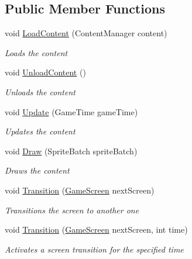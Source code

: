 \subsection*{Public Member Functions}
\begin{DoxyCompactItemize}
\item 
void \hyperlink{class_hel_project_1_1_u_i_1_1_screen_manager_a0077b58a60247c9dc7b4a4cc451b1830}{Load\+Content} (Content\+Manager content)
\begin{DoxyCompactList}\small\item\em Loads the content \end{DoxyCompactList}\item 
void \hyperlink{class_hel_project_1_1_u_i_1_1_screen_manager_a63aa06a4fbc8185e0d414cfc6a54a380}{Unload\+Content} ()
\begin{DoxyCompactList}\small\item\em Unloads the content \end{DoxyCompactList}\item 
void \hyperlink{class_hel_project_1_1_u_i_1_1_screen_manager_aaffdee1d0be5822763de36ce685e12ef}{Update} (Game\+Time game\+Time)
\begin{DoxyCompactList}\small\item\em Updates the content \end{DoxyCompactList}\item 
void \hyperlink{class_hel_project_1_1_u_i_1_1_screen_manager_a3eeb4573fdec335fbf349c2593cf9908}{Draw} (Sprite\+Batch sprite\+Batch)
\begin{DoxyCompactList}\small\item\em Draws the content \end{DoxyCompactList}\item 
void \hyperlink{class_hel_project_1_1_u_i_1_1_screen_manager_abd464cca71b81c7d1ee583314eb920d6}{Transition} (\hyperlink{class_hel_project_1_1_u_i_1_1_game_screen}{Game\+Screen} next\+Screen)
\begin{DoxyCompactList}\small\item\em Transitions the screen to another one \end{DoxyCompactList}\item 
void \hyperlink{class_hel_project_1_1_u_i_1_1_screen_manager_af8280a0980fb4b12d2d4d7c2b299f3d9}{Transition} (\hyperlink{class_hel_project_1_1_u_i_1_1_game_screen}{Game\+Screen} next\+Screen, int time)
\begin{DoxyCompactList}\small\item\em Activates a screen transition for the specified time \end{DoxyCompactList}\item 

\end{DoxyCompactItemize}
